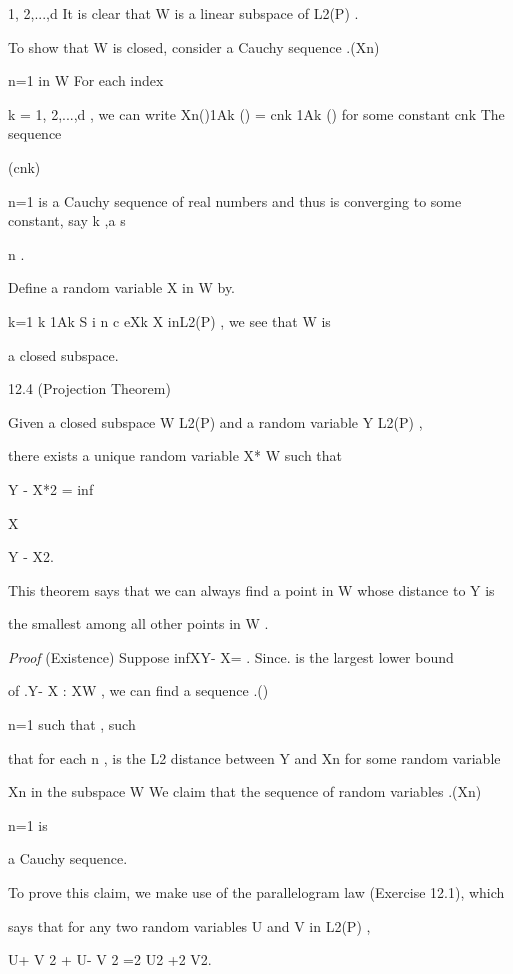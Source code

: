 1, 2,...,d It is clear that W is a linear subspace of L2(P) .

To show that W is closed, consider a Cauchy sequence .(Xn)\infty

n=1 in W For each index

k = 1, 2,...,d , we can write Xn()1Ak () = cnk 1Ak () for some constant cnk The sequence

(cnk)\infty

n=1 is a Cauchy sequence of real numbers and thus is converging to some constant, say k ,a s

n \to\infty .

Define a random variable X in W by.

\sumd

k=1 k 1Ak S i n c eXk \to X inL2(P) , we see that W is

a closed subspace.

\begin{thmbox}{12.4 (Projection Theorem)}
\end{thmbox}

Given a closed subspace W \subseteq L2(P) and a random variable Y \in L2(P) ,

there exists a unique random variable X* \in W such that

Y - X*2 = inf

X\inW

Y - X2.

This theorem says that we can always find a point in W whose distance to Y is

the smallest among all other points in W .

\textit{Proof} (Existence) Suppose infX\inW Y- X= \alpha. Since. \alpha is the largest lower bound

of .{Y- X : X\in W } , we can find a sequence .(\alphan)\infty

n=1 such that \alphan \alpha , such

that for each n , \alphan is the L2 distance between Y and Xn for some random variable

Xn in the subspace W We claim that the sequence of random variables .(Xn)\infty

n=1 is

a Cauchy sequence.

To prove this claim, we make use of the parallelogram law (Exercise 12.1), which

says that for any two random variables U and V in L2(P) ,

U+ V 2 + U- V 2 =2 U2 +2 V2.

